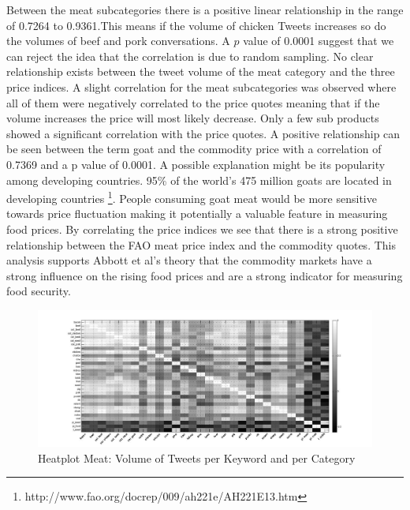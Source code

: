 Between the meat subcategories there is a  positive linear relationship in the range of 0.7264 to 0.9361.This means if the volume of chicken Tweets increases so do the volumes of beef and pork conversations. A $p$ value of 0.0001 suggest that we can reject the idea that the correlation is due to random sampling. No clear relationship exists between the tweet volume of the meat category and the three price indices. A slight correlation for the meat subcategories was observed where all of them were negatively correlated to the price quotes meaning that if the volume increases the price will most likely decrease. Only a few sub products showed a significant correlation with the price quotes. A positive relationship can be seen between the term goat and the commodity price with a correlation of 0.7369 and a p value of 0.0001. A possible explanation might be its popularity among developing countries. 95\% of the world's 475 million goats are located in developing countries \footnote{http://www.fao.org/docrep/009/ah221e/AH221E13.htm}. People consuming goat meat would be more sensitive towards price fluctuation making it potentially a valuable feature in measuring food prices. By correlating the price indices we see that there is a strong positive relationship between the FAO meat price index and the commodity quotes. This analysis supports Abbott et al's theory \cite{abbott2009}  that the commodity markets have a strong influence on the rising food prices and are a strong indicator for measuring food security. 



\begin{figure}[H]
        \centering
         \includegraphics[width=1\textwidth ]{img/anal/meat_black}
              
        \caption{Heatplot Meat: Volume of Tweets per Keyword and per Category}
        \label{fig:distribution}
\end{figure}



